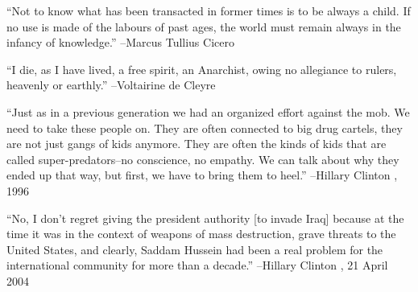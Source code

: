 \documentclass{article}%
\begin{document}
\linebreak%
\vspace{1mm}%
\begin{minipage}{\textwidth}%
\flushleft%
“Not to know what has been transacted in former times is to be always a child. If no use is made of the labours of past ages, the world must remain always in the infancy of knowledge.”%
\linebreak%
\vspace{1mm}%
–Marcus Tullius Cicero%
\linebreak%
\vspace{1mm}%
\end{minipage}%
\linebreak%
\vspace{1mm}%
\begin{minipage}{\textwidth}%
\flushleft%
“I die, as I have lived, a free spirit, an Anarchist, owing no allegiance to rulers, heavenly or earthly.”%
\linebreak%
\vspace{1mm}%
–Voltairine de Cleyre%
\linebreak%
\vspace{1mm}%
\end{minipage}%
\linebreak%
\vspace{1mm}%
\begin{minipage}{\textwidth}%
\flushleft%
“Just as in a previous generation we had an organized effort against the mob. We need to take these people on. They are often connected to big drug cartels, they are not just gangs of kids anymore. They are often the kinds of kids that are called super{-}predators–no conscience, no empathy. We can talk about why they ended up that way, but first, we have to bring them to heel.”%
\linebreak%
\vspace{1mm}%
–Hillary Clinton%
, 1996%
\linebreak%
\vspace{1mm}%
\end{minipage}%
\linebreak%
\vspace{1mm}%
\begin{minipage}{\textwidth}%
\flushleft%
“No, I don't regret giving the president authority {[}to invade Iraq{]} because at the time it was in the context of weapons of mass destruction, grave threats to the United States, and clearly, Saddam Hussein had been a real problem for the international community for more than a decade.”%
\linebreak%
\vspace{1mm}%
–Hillary Clinton%
, 21 April 2004%
\linebreak%
\vspace{1mm}%
\end{minipage}%
\end{document}
